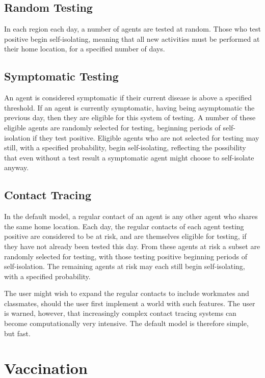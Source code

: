 \documentclass[10pt,letterpaper]{article}
\begin{document}
\subsection{Random Testing}

In each region each day, a number of agents are tested at random. Those who test positive begin self-isolating, meaning that all new activities must be performed at their home location, for a specified number of days.

\subsection{Symptomatic Testing}

An agent is considered symptomatic if their current disease is above a specified threshold. If an agent is currently symptomatic, having being asymptomatic the previous day, then they are eligible for this system of testing. A number of these eligible agents are randomly selected for testing, beginning periods of self-isolation if they test positive. Eligible agents who are not selected for testing may still, with a specified probability, begin self-isolating, reflecting the possibility that even without a test result a symptomatic agent might choose to self-isolate anyway.

\subsection{Contact Tracing}

In the default model, a regular contact of an agent is any other agent who shares the same  home location. Each day, the regular contacts of each agent testing positive are considered to be at risk, and are themselves eligible for testing, if they have not already been tested this day. From these agents at risk a subset are randomly selected for testing, with those testing positive beginning periods of self-isolation. The remaining agents at risk may each still begin self-isolating, with a specified probability.

The user might wish to expand the regular contacts to include workmates and classmates, should the user first implement a world with such features. The user is warned, however, that increasingly complex contact tracing systems can become computationally very intensive. The default model is therefore simple, but fast.

\section{Vaccination}
\end{document}
